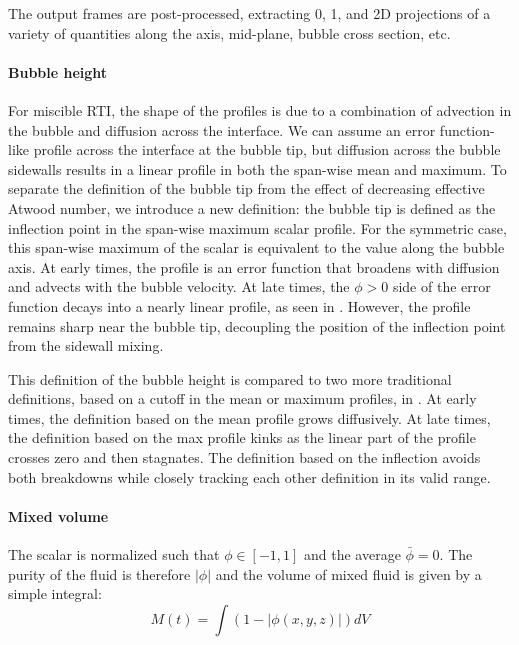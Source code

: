 The output frames are post-processed, extracting 0, 1, and 2D projections of a variety of quantities along the axis, mid-plane, bubble cross section, etc.


\paragraph{Bubble height}
For miscible RTI, the shape of the profiles is due to a combination of advection in the bubble and diffusion across the interface.
We can assume an error function-like profile across the interface at the bubble tip, but diffusion across the bubble sidewalls results in a linear profile in both the span-wise mean and maximum.
To separate the definition of the bubble tip from the effect of decreasing effective Atwood number, we introduce a new definition: the bubble tip is defined as the inflection point in the span-wise maximum scalar profile.
For the symmetric case, this span-wise maximum of the scalar is equivalent to the value along the bubble axis.
At early times, the profile is an error function that broadens with diffusion and advects with the bubble velocity.
At late times, the $\phi > 0$ side of the error function decays into a nearly linear profile, as seen in .
However, the profile remains sharp near the bubble tip, decoupling the position of the inflection point from the sidewall mixing.

This definition of the bubble height is compared to two more traditional definitions, based on a cutoff in the mean or maximum profiles, in .
At early times, the definition based on the mean profile grows diffusively.
At late times, the definition based on the max profile kinks as the linear part of the profile crosses zero and then stagnates.
The definition based on the inflection avoids both breakdowns while closely tracking each other definition in its valid range.

\paragraph{Mixed volume}

The scalar is normalized such that $\phi \in \left[-1, 1\right]$ and the average $\bar\phi = 0$.
The purity of the fluid is therefore $\left| \phi \right|$ and the volume of mixed fluid is given by a simple integral:
\begin{equation}
M(t) = \int \left( 1 - \left| \phi(x,y,z) \right|\right) dV
\end{equation}

